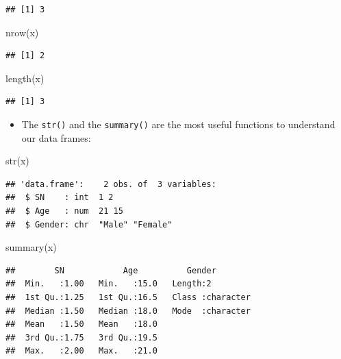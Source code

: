 \documentclass[
]{book}
\newenvironment{Shaded}{\begin{snugshade}}{\end{snugshade}}
\newcommand{\FunctionTok}[1]{\textcolor[rgb]{0.00,0.00,0.00}{#1}}
\newcommand{\NormalTok}[1]{#1}
\providecommand{\tightlist}{%
  \setlength{\itemsep}{0pt}\setlength{\parskip}{0pt}}
\theoremstyle{definition}
\theoremstyle{definition}
\theoremstyle{definition}
\theoremstyle{definition}
\theoremstyle{remark}
\begin{document}
\begin{verbatim}
## [1] 3
\end{verbatim}

\begin{Shaded}
\begin{Highlighting}[]
\FunctionTok{nrow}\NormalTok{(x)}
\end{Highlighting}
\end{Shaded}

\begin{verbatim}
## [1] 2
\end{verbatim}

\begin{Shaded}
\begin{Highlighting}[]
\FunctionTok{length}\NormalTok{(x)}
\end{Highlighting}
\end{Shaded}

\begin{verbatim}
## [1] 3
\end{verbatim}

\begin{itemize}
\tightlist
\item
  The \texttt{str()} and the \texttt{summary()} are the most useful functions to understand our data frames:
\end{itemize}

\begin{Shaded}
\begin{Highlighting}[]
\FunctionTok{str}\NormalTok{(x)}
\end{Highlighting}
\end{Shaded}

\begin{verbatim}
## 'data.frame':    2 obs. of  3 variables:
##  $ SN    : int  1 2
##  $ Age   : num  21 15
##  $ Gender: chr  "Male" "Female"
\end{verbatim}

\begin{Shaded}
\begin{Highlighting}[]
\FunctionTok{summary}\NormalTok{(x)}
\end{Highlighting}
\end{Shaded}

\begin{verbatim}
##        SN            Age          Gender         
##  Min.   :1.00   Min.   :15.0   Length:2          
##  1st Qu.:1.25   1st Qu.:16.5   Class :character  
##  Median :1.50   Median :18.0   Mode  :character  
##  Mean   :1.50   Mean   :18.0                     
##  3rd Qu.:1.75   3rd Qu.:19.5                     
##  Max.   :2.00   Max.   :21.0
\end{verbatim}
\end{document}
